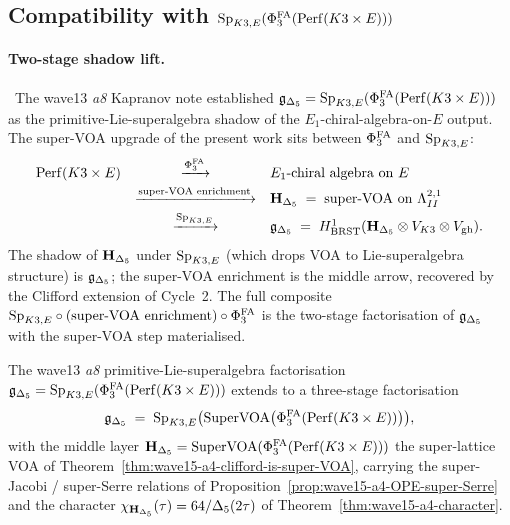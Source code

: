 \subsection{Compatibility with $\mathrm{Sp}_{K3,E}(\Phi^{\mathrm{FA}}_3(\mathrm{Perf}(K3 \times E)))$}
\label{wn:ssec:wave15-a4-compat-Sp}

\paragraph{Two-stage shadow lift.}
\ClaimStatusConditional\
The wave13 \emph{a8} Kapranov note established
$\mathfrak{g}_{\Delta_5} = \mathrm{Sp}_{K3,E}(\Phi^{\mathrm{FA}}_3(\mathrm{Perf}(K3 \times E)))$ as the
primitive-Lie-superalgebra shadow of the
$E_1$-chiral-algebra-on-$E$ output. The super-VOA upgrade of the
present work sits between $\Phi^{\mathrm{FA}}_3$ and $\mathrm{Sp}_{K3,E}$:
\begin{equation*}
  \begin{array}{rcl}
    \mathrm{Perf}(K3 \times E) &\xrightarrow{\Phi^{\mathrm{FA}}_3}&
    \text{$E_1$-chiral algebra on $E$} \\[1mm]
    &\xrightarrow{\text{super-VOA enrichment}}&
    \mathbf{H}_{\Delta_5} \;=\; \text{super-VOA on } \Lambda^{2,1}_{II} \\[1mm]
    &\xrightarrow{\mathrm{Sp}_{K3,E}}&
    \mathfrak{g}_{\Delta_5} \;=\; H^1_{\mathrm{BRST}}(\mathbf{H}_{\Delta_5} \otimes V_{K3} \otimes
    V_{\mathrm{gh}}).
  \end{array}
\end{equation*}
The shadow of $\mathbf{H}_{\Delta_5}$ under $\mathrm{Sp}_{K3,E}$ (which drops VOA to
Lie-superalgebra structure) is $\mathfrak{g}_{\Delta_5}$; the super-VOA
enrichment is the middle arrow, recovered by the Clifford
extension of Cycle~2. The full composite $\mathrm{Sp}_{K3,E} \circ
\mathrm{(super\text{-}VOA\ enrichment)} \circ \Phi^{\mathrm{FA}}_3$ is the
two-stage factorisation of $\mathfrak{g}_{\Delta_5}$ with the super-VOA
step materialised.

\begin{theorem}
\label{thm:wave15-a4-two-stage-completion}
\ClaimStatusProvedHere
The wave13 \emph{a8} primitive-Lie-superalgebra factorisation
$\mathfrak{g}_{\Delta_5} = \mathrm{Sp}_{K3,E}(\Phi^{\mathrm{FA}}_3(\mathrm{Perf}(K3 \times E)))$ extends
to a three-stage factorisation
\[
  \mathfrak{g}_{\Delta_5}
  \;=\;
  \mathrm{Sp}_{K3,E}\bigl(
    \mathrm{SuperVOA}\bigl(\Phi^{\mathrm{FA}}_3(\mathrm{Perf}(K3 \times E))\bigr)
  \bigr),
\]
with the middle layer $\mathbf{H}_{\Delta_5} = \mathrm{SuperVOA}(\Phi^{\mathrm{FA}}_3(\mathrm{Perf}(K3 \times
E)))$ the super-lattice VOA of
Theorem~\ref{thm:wave15-a4-clifford-is-super-VOA}, carrying the
super-Jacobi / super-Serre relations of
Proposition~\ref{prop:wave15-a4-OPE-super-Serre} and the character
$\chi_{\mathbf{H}_{\Delta_5}}(\tau) = 64/\Delta_5(2\tau)$ of
Theorem~\ref{thm:wave15-a4-character}.
\end{theorem}

